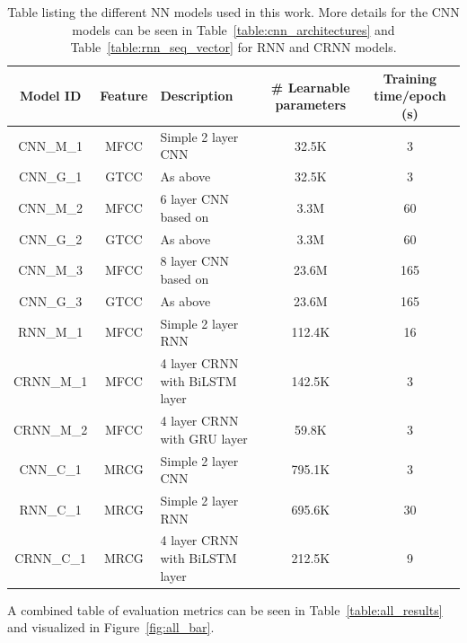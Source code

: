 \begin{table}
\begin{center}
\begin{tabular}{c c l c c}
\toprule
Model ID & Feature & Description & \# Learnable parameters & Training time/epoch (s) \\ [0.5ex]
\midrule
CNN\_M\_1 & MFCC & Simple 2 layer CNN & 32.5K & 3 \\
CNN\_G\_1 & GTCC & As above & 32.5K & 3 \\
CNN\_M\_2 & MFCC & 6 layer CNN based on~\cite{ruff2020automated} & 3.3M & 60 \\
CNN\_G\_2 & GTCC & As above & 3.3M & 60 \\
CNN\_M\_3 & MFCC & 8 layer CNN based on~\cite{kahl2017large} & 23.6M & 165 \\
CNN\_G\_3 & GTCC & As above & 23.6M & 165 \\
RNN\_M\_1 & MFCC & Simple 2 layer RNN & 112.4K & 16 \\
CRNN\_M\_1 & MFCC & 4 layer CRNN with BiLSTM layer & 142.5K & 3 \\
CRNN\_M\_2 & MFCC & 4 layer CRNN with GRU layer & 59.8K & 3 \\
CNN\_C\_1 & MRCG & Simple 2 layer CNN & 795.1K & 3 \\
RNN\_C\_1 & MRCG & Simple 2 layer RNN & 695.6K & 30 \\
CRNN\_C\_1 & MRCG & 4 layer CRNN with BiLSTM layer & 212.5K & 9 \\
\bottomrule
\end{tabular}
\caption{Table listing the different NN models used in this work. More details
for the CNN models can be seen in Table~\ref{table:cnn_architectures} and
Table~\ref{table:rnn_seq_vector} for RNN and CRNN models.}\label{table:nn_models}
\end{center}
\end{table}

A combined table of evaluation metrics can be seen in
Table~\ref{table:all_results} and visualized in Figure~\ref{fig:all_bar}.

